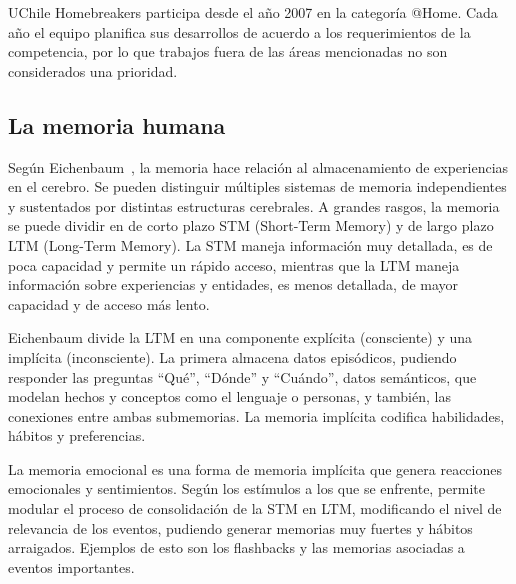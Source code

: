 UChile Homebreakers participa desde el año 2007 en la categoría @Home. Cada año el equipo planifica sus desarrollos de acuerdo a los requerimientos de la competencia, por lo que trabajos fuera de las áreas mencionadas no son considerados una prioridad.


\subsection{La memoria humana}

Según Eichenbaum~\cite{Eichenbaum:2008}, la memoria hace relación al almacenamiento de experiencias en el cerebro. Se pueden distinguir múltiples sistemas de memoria independientes y sustentados por distintas estructuras cerebrales. A grandes rasgos, la memoria se puede dividir en de corto plazo STM (Short-Term Memory) y de largo plazo LTM (Long-Term Memory). La STM maneja información muy detallada, es de poca capacidad y permite un rápido acceso, mientras que la LTM maneja información sobre experiencias y entidades, es menos detallada, de mayor capacidad y de acceso más lento.

Eichenbaum divide la LTM en una componente explícita (consciente) y una implícita (inconsciente). La primera almacena datos episódicos, pudiendo responder las preguntas ``Qué'', ``Dónde'' y ``Cuándo'', datos semánticos, que modelan hechos y conceptos como el lenguaje o personas, y también, las conexiones entre ambas submemorias. La memoria implícita codifica habilidades, hábitos y preferencias.

La memoria emocional es una forma de memoria implícita que genera reacciones emocionales y sentimientos. Según los estímulos a los que se enfrente, permite modular el proceso de consolidación de la STM en LTM, modificando el nivel de relevancia de los eventos, pudiendo generar memorias muy fuertes y hábitos arraigados. Ejemplos de esto son los flashbacks y las memorias asociadas a eventos importantes.





